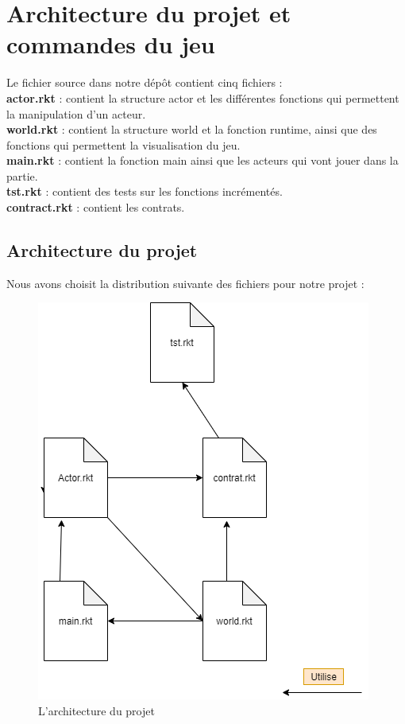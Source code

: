\documentclass[a4paper]{article}
\begin{document}
\section{Architecture du projet et commandes du jeu}
Le fichier source dans notre dépôt contient cinq fichiers :\\
\textbf{actor.rkt} : contient la structure actor et les différentes fonctions qui permettent la manipulation d'un acteur.\\
\textbf{world.rkt} : contient la structure world et la fonction runtime, ainsi que des fonctions qui permettent la visualisation du jeu.\\
\textbf{main.rkt} : contient la fonction main ainsi que les acteurs qui vont jouer dans la partie.\\
\textbf{tst.rkt} : contient des tests sur les fonctions incrémentés.\\
\textbf{contract.rkt} : contient les contrats.

\subsection{Architecture du projet}
Nous avons choisit la distribution suivante des fichiers pour notre projet :
\begin{figure}[H]
    \centering
    \includegraphics[scale=0.6]{Pictures/architecture.png}
    \caption{L'architecture du projet}
    \label{architecture}
\end{figure}
\end{document}
